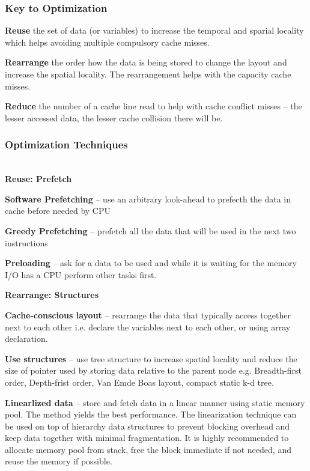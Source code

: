 \documentclass[journal]{IEEEtran}
\begin{document}
\subsubsection{Key to Optimization}
\begin{description}
   \item\textbf{Reuse} the set of data (or variables) to 
      increase the temporal and sparial locality which helps avoiding 
      multiple compulsory cache misses.
   \item\textbf{Rearrange} the order how the data is being stored to change
      the layout and increase the spatial locality. The rearrangement helps
      with the capacity cache misses.
   \item\textbf{Reduce} the number of a cache line read to help with cache
      conflict misses -- the lesser accessed data, the lesser cache collision
      there will be.
      \newline
\end{description}

\subsubsection{Optimization Techniques}
\textbf{\\Reuse: Prefetch}
\begin{description}
   \item\textbf{Software Prefetching} -- use an arbitrary look-ahead to 
      prefecth the data in cache before needed by CPU
   \item\textbf{Greedy Prefetching} -- prefetch all the data that will be 
      used in the next two instructions
   \item\textbf{Preloading} -- ask for a data to be used and while it is 
      waiting for the memory I/O has a CPU perform  other tasks first.
\end{description}

\textbf{Rearrange: Structures}
\begin{description}
   \item\textbf{Cache-conscious layout} -- rearrange the data that typically
      access together next to each other i.e. declare the variables next to
      each other, or using array declaration. 
   \item\textbf{Use structures} -- use tree structure to increase spatial 
      locality and reduce the size of pointer used by storing data relative
      to the parent node e.g. Breadth-first order, Depth-frist order, Van 
      Emde Boas layout, compact static k-d tree.
      \newline
      \newline
   \item\textbf{Linearlized data} -- store and fetch data in a linear manner
      using static memory pool. The method yields the best performance. The
      linearization technique can be used on top of hierarchy data 
      structures to prevent blocking overhead and keep data together with
      minimal fragmentation. It is highly recommended to allocate memory 
      pool from stack, free the block immediate if not needed, and reuse the
      memory if possible. 
\end{description}
\end{document}
